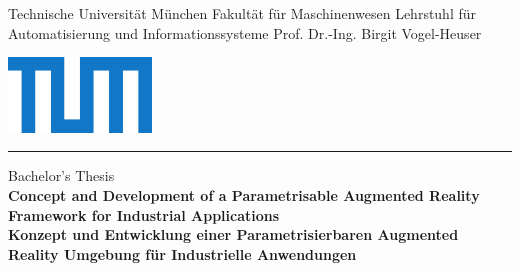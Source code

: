 \begin{titlepage}
	\begin{center}
%
%	
	\begin{minipage}[c]{9cm}
		\small
		Technische Universität München\newline
		Fakultät für Maschinenwesen\newline
		Lehrstuhl für Automatisierung und Informationssysteme\newline
		Prof. Dr.-Ing. Birgit Vogel-Heuser
	\end{minipage}
	\begin{minipage}[c]{6cm}
		\centering \includegraphics[height=2.0cm]{Figures/TUM_Logo_cmyk.pdf}
	\end{minipage}
%
%
%		
%		

	\rule{0.95\textwidth}{0.3mm}
	
	\vspace{1.0cm}
		
	\LARGE
	Bachelor's Thesis
	\\[1cm]
	\huge
	\textbf{
		Concept and Development of a Parametrisable Augmented Reality Framework for Industrial Applications}\\
	\vspace{0.8cm}
	\huge
	\textbf{Konzept und Entwicklung einer Parametrisierbaren Augmented Reality Umgebung für Industrielle Anwendungen}
	\end{center}
	

\end{titlepage}
